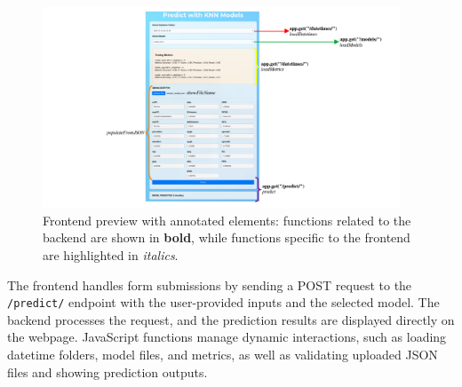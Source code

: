 \begin{figure}[H]
	\centering
	\includegraphics[width=0.95\textwidth,height=0.40\textheight]{../images/api/frontend.png}
	\caption{Frontend preview with annotated elements: functions related to the
		backend are shown in \textbf{bold}, while functions specific to the frontend
		are highlighted in \textit{italics}.}
	\label{fig:fig5}
\end{figure}

The frontend handles form submissions by sending a POST request to the
\texttt{/predict/} endpoint with the user-provided inputs and the selected
model. The backend processes the request, and the prediction results are
displayed directly on the webpage. JavaScript functions manage dynamic
interactions, such as loading datetime folders, model files, and metrics, as
well as validating uploaded JSON files and showing prediction outputs.
